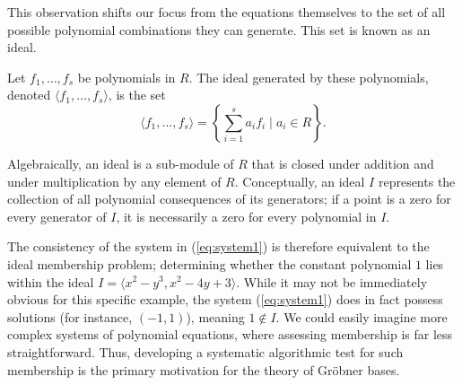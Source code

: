 This observation shifts our focus from the equations themselves to the set of all possible polynomial combinations they can generate. This set is known as an ideal.

\begin{definition}[Ideal]
\label{def:ideal}
Let $f_1, \dots, f_s$ be polynomials in $R$. The ideal generated by these polynomials, denoted $\langle f_1, \dots, f_s \rangle$, is the set
\begin{equation}
\langle f_1, \dots, f_s \rangle = \left\{ \sum_{i=1}^{s} a_i f_i \mid a_i \in R \right\}.
\end{equation}
\end{definition}

Algebraically, an ideal is a sub-module of $R$ that is closed under addition and under multiplication by any element of $R$. Conceptually, an ideal $I$ represents the collection of all polynomial consequences of its generators; if a point is a zero for every generator of $I$, it is necessarily a zero for every polynomial in $I$.

The consistency of the system in (\ref{eq:system1}) is therefore equivalent to the ideal membership problem; determining whether the constant polynomial $1$ lies within the ideal $I = \langle x^{2} - y^{3}, x^{2} - 4y + 3 \rangle$. While it may not be immediately obvious for this specific example, the system (\ref{eq:system1}) does in fact possess solutions (for instance, $(-1, 1)$), meaning $1 \notin I$. We could easily imagine more complex systems of polynomial equations, where assessing membership is far less straightforward. Thus, developing a systematic algorithmic test for such membership is the primary motivation for the theory of Gröbner bases.